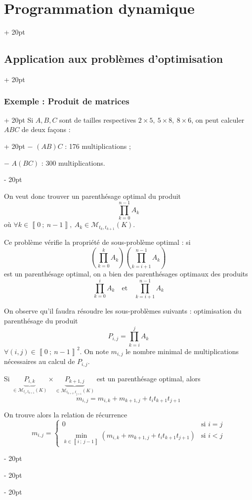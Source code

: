 \documentclass[a4paper, 12pt, twoside]{article}
\newcommand{\nset}[2]{\left\llbracket #1\ ;\ #2 \right\rrbracket}
\newcommand{\lr}[1]{\left( #1 \right)}
\newcommand{\ind}[1][20pt]{\advance\leftskip + #1}
\newcommand{\deind}[1][20pt]{\advance\leftskip - #1}
\newenvironment{indt}[2][20pt]{#2 \par \ind[#1]}{\par \deind} %
\begin{document}
\begin{indt}{\section{Programmation dynamique}}
\begin{indt}{\subsection{Application aux problèmes d'optimisation}}
\begin{indt}{\subsubsection{Exemple : Produit de matrices}}
                \begin{indt}{Si $A, B, C$ sont de tailles respectives $2 \times 5,\ 5 \times 8,\ 8 \times 6$, on peut calculer $ABC$ de deux façons :}
                    $-$ $(AB)C$ : 176 multiplications ;
                    
                    $-$ $A(BC)$ : 300 multiplications.
                \end{indt}
                
                On veut donc trouver un parenthésage optimal du produit
                    \[ \prod_{k = 0}^{n - 1} A_k \]
                où $\forall k \in \nset{0}{n - 1},\ A_k \in \mathcal M_{t_k, t_{k + 1}} (K)$.
                
                \vspace{12pt}
                
                Ce problème vérifie la propriété de sous-problème optimal : si
                    \[ \lr{ \prod_{k = 0}^k A_k } \lr{ \prod_{k = i + 1}^{n - 1} A_k } \]
                est un parenthésage optimal, on a bien des parenthésages optimaux des produits
                    \[ \prod_{k = 0}^i A_k \quad \text{et} \quad \prod_{k = i + 1}^{n - 1} A_k \]
                
                On observe qu'il faudra résoudre les sous-problèmes suivants : optimisation du parenthésage du produit
                    \[ P_{i, j} = \prod_{k = i}^j A_k \]
                $\forall (i, j) \in \nset 0 {n - 1}^2$. On note $m_{i, j}$ le nombre minimal de multiplications nécessaires au calcul de $P_{i, j}$.
                
                Si $\underbrace{P_{i, k}}_{\in \mathcal M_{t_i, t_{k + 1} }(K)} \times \underbrace{P_{k + 1, j}}_{\in \mathcal M_{t_{k + 1}, t_{j + 1}}(K)}$ est un parenthésage optimal, alors
                    \[ m_{i, j} = m_{i, k} + m_{k + 1, j} + t_i t_{k + 1} t_{j + 1} \]
                
                On trouve alors la relation de récurrence
                    \[
                        m_{i, j} =
                        \left\{
                        \begin{array}{ll}
                            0
                            & \text{si $i = j$}
                            \\
                            \min\limits_{k \in \nset{i}{j - 1}} \lr{ m_{i, k} + m_{k + 1, j} + t_i t_{k + 1} t_{j + 1} }
                            & \text{si $i < j$}
                        \end{array}
                        \right.
                    \]
                

\end{indt}
\end{indt}
\end{indt}
\end{document}
